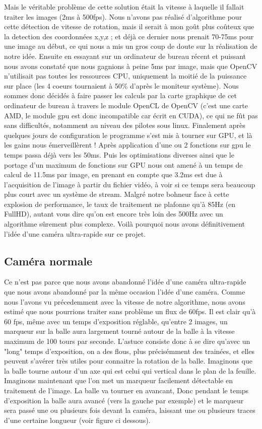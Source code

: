 Mais le véritable problème de cette solution était la vitesse à laquelle il fallait traiter les images (2ms à 500fps). Nous n'avons pas réalisé d'algorithme pour cette détection de vitesse de rotation, mais il serait à mon goût plus coûteux que la detection des coordonnées x,y,z ; et déjà ce dernier nous prenait 70-75ms pour une image au début, ce qui nous a mis un gros coup de doute sur la réalisation de notre idée. Ensuite en essayant sur un ordinateur de bureau récent et puissant nous avons constaté que nous gagnions à peine 5ms par image, mais que OpenCV n'utilisait pas toutes les ressources CPU, uniquement la moitié de la puissance sur place (les 4 coeurs tournaient à 50\% d'après le moniteur système). Nous sommes donc décidés à faire passer les calculs par la carte graphique de cet ordinateur de bureau à travers le module OpenCL de OpenCV (c'est une carte AMD, le module gpu est donc incompatible car écrit en CUDA), ce qui ne fût pas sans difficultés, notamment au niveau des pilotes sous linux. Finalement après quelques jours de configuration le programme s'est mis à tourner sur GPU, et là les gains nous émerveillèrent ! Après application d'une ou 2 fonctions sur gpu le temps passa déjà vers les 50ms. Puis les optimisations diverses ainsi que le portage d'un maximum de fonctions sur GPU nous ont amené à un temps de calcul de 11.5ms par image, en prenant en compte que 3.2ms est due à l'acquisition de l'image à partir du fichier vidéo, à voir si ce temps sera beaucoup plus court avec un système de stream. Malgré notre bohneur face à cette explosion de performance, le taux de traitement ne plafonne qu'à 85Hz (en FullHD), autant vous dire qu'on est encore très loin des 500Hz avec un algorithme sûrement plus complexe. Voilà pourquoi nous avons définitivement l'idée d'une caméra ultra-rapide sur ce projet.


\subsection{Caméra normale}

Ce n'est pas parce que nous avons abandonné l'idée d'une caméra ultra-rapide que nous avons abandonné par la même occasion l'idée d'une caméra. Comme nous l'avons vu précedemment avec la vitesse de notre algorithme, nous avons estimé que nous pourrions traiter sans problème un flux de 60fps. Il est clair qu'à 60 fps, même avec un temps d'exposition réglable, qu'entre 2 images, un marqueur sur la balle aura largement tourné autour de la balle à la vitesse maximum de 100 tours par seconde. L'astuce consiste donc à se dire qu'avec un "long" temps d'exposition, on a des flous, plus précisémment des trainées, et elles peuvent s'avérer très utiles pour connaitre la rotation de la balle. Imaginons que la balle tourne autour d'un axe qui est celui qui vertical dans le plan de la feuille. Imaginons maintenant que l'on met un marqueur facilement détectable en traitement de l'image. La balle va tourner en avancant, Donc pendant le temps d'exposition la balle aura avancé (vers la gauche par exemple) et le marqueur sera passé une ou plusieurs fois devant la caméra, laissant une ou plusieurs traces d'une certaine longueur (voir figure ci dessous).

